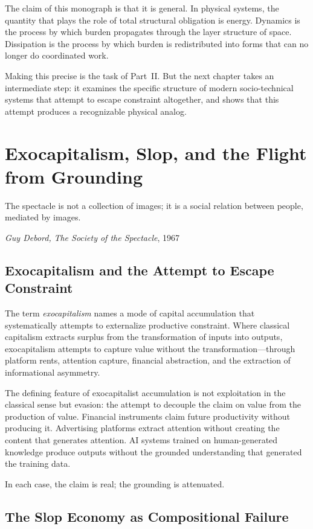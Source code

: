 \documentclass[12pt,a4paper,openany]{book}
\theoremstyle{plain}
\theoremstyle{definition}
\theoremstyle{remark}
\begin{document}
The claim of this monograph is that it is general. In physical systems, the quantity that plays the role of total structural obligation is energy. Dynamics is the process by which burden propagates through the layer structure of space. Dissipation is the process by which burden is redistributed into forms that can no longer do coordinated work.

Making this precise is the task of Part~II. But the next chapter takes an intermediate step: it examines the specific structure of modern socio-technical systems that attempt to escape constraint altogether, and shows that this attempt produces a recognizable physical analog.

\chapter{Exocapitalism, Slop, and the Flight from Grounding}

\epigraph{%
  The spectacle is not a collection of images; it is a social relation between people,
  mediated by images.
}{%
  \textit{Guy Debord,} \textit{The Society of the Spectacle}, 1967
}

\section{Exocapitalism and the Attempt to Escape Constraint}

The term \emph{exocapitalism} names a mode of capital accumulation that systematically attempts to externalize productive constraint. Where classical capitalism extracts surplus from the transformation of inputs into outputs, exocapitalism attempts to capture value without the transformation---through platform rents, attention capture, financial abstraction, and the extraction of informational asymmetry.

The defining feature of exocapitalist accumulation is not exploitation in the classical sense but evasion: the attempt to decouple the claim on value from the production of value. Financial instruments claim future productivity without producing it. Advertising platforms extract attention without creating the content that generates attention. AI systems trained on human-generated knowledge produce outputs without the grounded understanding that generated the training data.

In each case, the claim is real; the grounding is attenuated.

\section{The Slop Economy as Compositional Failure}
\end{document}
